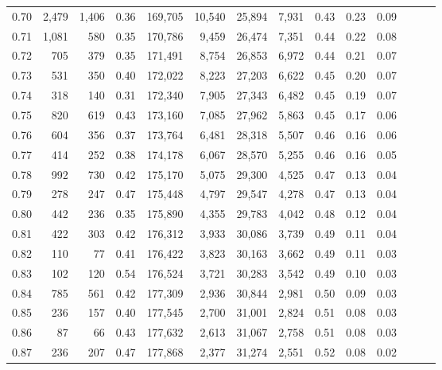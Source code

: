 \begin{tabular}{rrrrrrrrrrrrrr}
0.70 &   2,479 &  1,406 &  0.36 &  169,705 &   10,540 &  25,894 &   7,931 &  0.43 &  0.23 &      0.09 \\
0.71 &   1,081 &    580 &  0.35 &  170,786 &    9,459 &  26,474 &   7,351 &  0.44 &  0.22 &      0.08 \\
0.72 &     705 &    379 &  0.35 &  171,491 &    8,754 &  26,853 &   6,972 &  0.44 &  0.21 &      0.07 \\
0.73 &     531 &    350 &  0.40 &  172,022 &    8,223 &  27,203 &   6,622 &  0.45 &  0.20 &      0.07 \\
0.74 &     318 &    140 &  0.31 &  172,340 &    7,905 &  27,343 &   6,482 &  0.45 &  0.19 &      0.07 \\
0.75 &     820 &    619 &  0.43 &  173,160 &    7,085 &  27,962 &   5,863 &  0.45 &  0.17 &      0.06 \\
0.76 &     604 &    356 &  0.37 &  173,764 &    6,481 &  28,318 &   5,507 &  0.46 &  0.16 &      0.06 \\
0.77 &     414 &    252 &  0.38 &  174,178 &    6,067 &  28,570 &   5,255 &  0.46 &  0.16 &      0.05 \\
0.78 &     992 &    730 &  0.42 &  175,170 &    5,075 &  29,300 &   4,525 &  0.47 &  0.13 &      0.04 \\
0.79 &     278 &    247 &  0.47 &  175,448 &    4,797 &  29,547 &   4,278 &  0.47 &  0.13 &      0.04 \\
0.80 &     442 &    236 &  0.35 &  175,890 &    4,355 &  29,783 &   4,042 &  0.48 &  0.12 &      0.04 \\
0.81 &     422 &    303 &  0.42 &  176,312 &    3,933 &  30,086 &   3,739 &  0.49 &  0.11 &      0.04 \\
0.82 &     110 &     77 &  0.41 &  176,422 &    3,823 &  30,163 &   3,662 &  0.49 &  0.11 &      0.03 \\
0.83 &     102 &    120 &  0.54 &  176,524 &    3,721 &  30,283 &   3,542 &  0.49 &  0.10 &      0.03 \\
0.84 &     785 &    561 &  0.42 &  177,309 &    2,936 &  30,844 &   2,981 &  0.50 &  0.09 &      0.03 \\
0.85 &     236 &    157 &  0.40 &  177,545 &    2,700 &  31,001 &   2,824 &  0.51 &  0.08 &      0.03 \\
0.86 &      87 &     66 &  0.43 &  177,632 &    2,613 &  31,067 &   2,758 &  0.51 &  0.08 &      0.03 \\
0.87 &     236 &    207 &  0.47 &  177,868 &    2,377 &  31,274 &   2,551 &  0.52 &  0.08 &      0.02 \\

\end{tabular}
